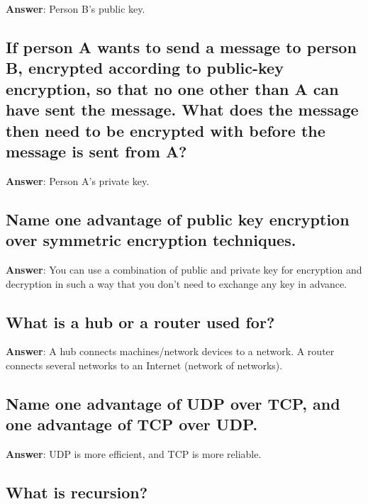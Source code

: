 \documentclass[a4paper,11pt,oneside]{article}
\begin{document}
\begin{sloppypar}
\label{q:168:sa:en:True}

\textbf{Answer}: Person B's public key.



\subsection{If person A wants to send a message to person B, encrypted according to public-key encryption, so that no one other than A can have sent the message. What does the message then need to be encrypted with before the message is sent from A?}

\label{q:169:sa:en:True}

\textbf{Answer}: Person A's private key.



\subsection{Name one advantage of public key encryption over symmetric encryption techniques.}

\label{q:170:sa:en:True}

\textbf{Answer}: You can use a combination of public and private key for encryption and decryption in such a way that you don't need to exchange any key in advance.



\subsection{What is a hub or a router used for?}

\label{q:171:sa:en:True}

\textbf{Answer}: A hub connects machines/network devices to a network. A router connects several networks to an Internet (network of networks).



\subsection{Name one advantage of UDP over TCP, and one advantage of TCP over UDP.}

\label{q:172:sa:en:True}

\textbf{Answer}: UDP is more efficient, and TCP is more reliable.



\subsection{What is recursion?}


\end{sloppypar}
\end{document}
